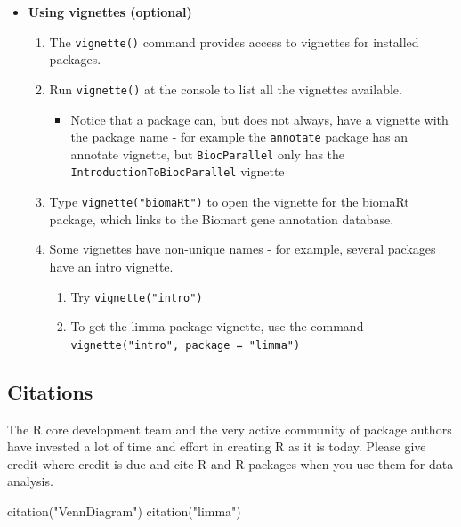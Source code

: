 \documentclass[a4paper]{book}
\newenvironment{Shaded}{}{}
\newcommand{\KeywordTok}[1]{\textcolor[rgb]{0.00,0.00,1.00}{{#1}}}
\newcommand{\StringTok}[1]{\textcolor[rgb]{0.00,0.50,0.50}{{#1}}}
\newcommand{\NormalTok}[1]{{#1}}
\providecommand{\tightlist}{%
  \setlength{\itemsep}{0pt}\setlength{\parskip}{0pt}}
\newlength{\leftbarwidth}
\newlength{\leftbarsep}
\newcommand*{\leftbarcolorcmd}{\color{darkgray}}%
\renewenvironment{leftbar}{%
    \def\FrameCommand{{\leftbarcolorcmd{\vrule width \leftbarwidth\relax\hspace {\leftbarsep}}}}%
    \MakeFramed {\advance \hsize -\width \FrameRestore }%
}{%
    \endMakeFramed
}
\renewenvironment{Shaded}
{\vspace{0em}\begin{leftbar}\begin{snugshade}}
{\end{snugshade}\end{leftbar}\vspace{0pt}}
\newenvironment{rmdblock}[1]
  {\vspace{1.5em}\begin{shaded*}
  \begin{itemize}
  \renewcommand{\labelitemi}{
    \raisebox{-.7\height}[0pt][0pt]{
      {\setkeys{Gin}{width=3em,keepaspectratio}\texttt{[image: images/\#1]}}
    }
  }
  \item
  }
  {
  \end{itemize}
  \end{shaded*}
  }
\newenvironment{rmdexercise}
  {\begin{rmdblock}{exercise}}
  {\end{rmdblock}}
\begin{document}
\begin{rmdexercise}
\textbf{Using vignettes (optional)}

\begin{enumerate}
\def\labelenumi{\arabic{enumi}.}
\item
  The \texttt{vignette()} command provides access to vignettes for
  installed packages.
\item
  Run \texttt{vignette()} at the console to list all the vignettes
  available.

  \begin{itemize}
  \tightlist
  \item
    Notice that a package can, but does not always, have a vignette with
    the package name - for example the \texttt{annotate} package has an
    annotate vignette, but \texttt{BiocParallel} only has the
    \texttt{IntroductionToBiocParallel} vignette
  \end{itemize}
\item
  Type \texttt{vignette("biomaRt")} to open the vignette for the biomaRt
  package, which links to the Biomart gene annotation database.
\item
  Some vignettes have non-unique names - for example, several packages
  have an intro vignette.

  \begin{enumerate}
  \def\labelenumii{\alph{enumii})}
  \tightlist
  \item
    Try \texttt{vignette("intro")}
  \item
    To get the limma package vignette, use the command
    \texttt{vignette("intro",\ package\ =\ "limma")}
  \end{enumerate}
\end{enumerate}
\end{rmdexercise}

\subsection{Citations}\label{citations}

The R core development team and the very active community of package
authors have invested a lot of time and effort in creating R as it is
today. Please give credit where credit is due and cite R and R packages
when you use them for data analysis.

\begin{Shaded}
\begin{Highlighting}[]
\KeywordTok{citation}\NormalTok{(}\StringTok{"VennDiagram"}\NormalTok{)}
\KeywordTok{citation}\NormalTok{(}\StringTok{"limma"}\NormalTok{)}
\end{Highlighting}
\end{Shaded}
\end{document}

